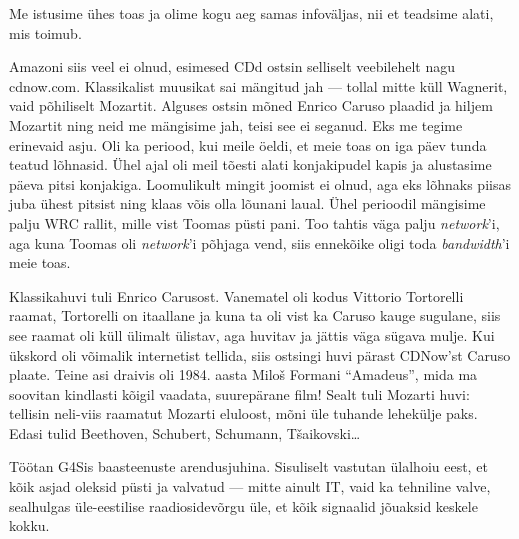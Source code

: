 
Me istusime ühes toas ja olime kogu aeg samas infoväljas, nii et teadsime alati, mis toimub.


Amazoni siis veel ei olnud, 
esimesed CDd ostsin selliselt veebilehelt nagu cdnow.com. 
Klassikalist muusikat sai mängitud jah --- tollal mitte küll 
Wagnerit, vaid põhiliselt Mozartit. 
Alguses ostsin mõned Enrico Caruso plaadid ja hiljem 
Mozartit ning neid me mängisime jah, teisi see ei seganud. Eks me tegime 
erinevaid asju. Oli ka periood, kui meile öeldi, et meie toas on iga päev tunda teatud lõhnasid. Ühel ajal oli meil tõesti alati 
konjakipudel kapis ja alustasime päeva pitsi konjakiga. Loomulikult 
mingit joomist ei olnud, aga eks lõhnaks piisas juba ühest pitsist ning klaas võis olla lõunani
laual. 
Ühel perioodil mängisime palju WRC rallit, mille vist Toomas püsti pani. Too tahtis väga palju \emph{network}'i, 
aga kuna Toomas oli \emph{network}'i põhjaga vend, siis ennekõike oligi toda 
\emph{bandwidth}'i meie toas.


Klassikahuvi tuli Enrico Carusost. Vanematel oli kodus 
Vittorio Tortorelli raamat, Tortorelli on itaallane ja kuna ta oli vist ka
Caruso kauge sugulane, siis see raamat 
oli küll ülimalt ülistav, aga huvitav ja jättis väga sügava mulje. 
Kui ükskord oli võimalik internetist tellida, siis ostsingi huvi pärast 
CDNow'st Caruso plaate. Teine asi draivis oli 1984. aasta 
Miloš Formani \enquote{Amadeus}, mida ma soovitan kindlasti kõigil vaadata, suurepärane 
film! Sealt tuli Mozarti huvi: tellisin neli-viis
raamatut Mozarti eluloost, mõni üle tuhande 
lehekülje paks. Edasi tulid Beethoven, Schubert, 
Schumann, Tšaikovski\ldots


Töötan G4Sis baasteenuste arendusjuhina. 
Sisuliselt vastutan ülalhoiu eest, et kõik asjad oleksid püsti ja valvatud --- mitte ainult IT, vaid ka tehniline valve, sealhulgas 
üle-eestilise raadiosidevõrgu üle, et kõik signaalid jõuaksid keskele kokku.
